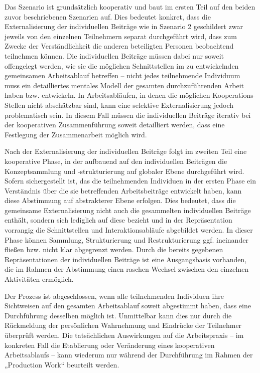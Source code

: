 Das Szenario ist grundsätzlich kooperativ und baut im ersten Teil auf den beiden zuvor beschriebenen Szenarien auf. Dies bedeutet konkret, dass die Externalisierung der individuellen Beiträge wie in Szenario 2 geschildert zwar jeweils von den einzelnen Teilnehmern separat durchgeführt wird, dass zum Zwecke der Verständlichkeit die anderen beteiligten Personen beobachtend teilnehmen können. Die individuellen Beiträge müssen dabei nur soweit offengelegt werden, wie sie die möglichen Schnittstellen im zu entwickelnden gemeinsamen Arbeitsablauf betreffen -- nicht jedes teilnehmende Individuum muss ein detailliertes mentales Modell der gesamten durchzuführenden Arbeit haben bzw. entwickeln. In Arbeitsabläufen, in denen die möglichen Kooperations-Stellen nicht abschätzbar sind, kann eine selektive Externalisierung jedoch problematisch sein. In diesem Fall müssen die individuellen Beiträge iterativ bei der kooperativen Zusammenführung soweit detailliert werden, dass eine Festlegung der Zusammenarbeit möglich wird.

Nach der Externalisierung der individuellen Beiträge folgt im zweiten Teil eine kooperative Phase, in der aufbauend auf den individuellen Beiträgen die Konzeptsammlung und -strukturierung auf globaler Ebene durchgeführt wird. Sofern sichergestellt ist, das die teilnehmenden Individuen in der ersten Phase ein Verständnis über die sie betreffenden Arbeitsbeiträge entwickelt haben, kann diese Abstimmung auf abstrakterer Ebene erfolgen. Dies bedeutet, dass die gemeinsame Externalisierung nicht auch die gesammelten individuellen Beiträge enthält, sondern sich lediglich auf diese bezieht und in der Repräsentation vorrangig die Schnittstellen und Interaktionsabläufe abgebildet werden. In dieser Phase können Sammlung, Strukturierung und Restrukturierung ggf. ineinander fließen bzw. nicht klar abgegrenzt werden. Durch die bereits gegebenen Repräsentationen der individuellen Beiträge ist eine Ausgangsbasis vorhanden, die im Rahmen der Abstimmung einen raschen Wechsel zwischen den einzelnen Aktivitäten ermöglich.

Der Prozess ist abgeschlossen, wenn alle teilnehmenden Individuen ihre Sichtweisen auf den gesamten Arbeitsablauf soweit abgestimmt haben, dass eine Durchführung desselben möglich ist. Unmittelbar kann dies nur durch die Rückmeldung der persönlichen Wahrnehmung und Eindrücke der Teilnehmer überprüft werden. Die tatsächlichen Auswirkungen auf die Arbeitspraxis -- im konkreten Fall die Etablierung oder Veränderung eines kooperativen Arbeitsablaufs -- kann wiederum nur während der Durchführung im Rahmen der „Production Work“ beurteilt werden.

